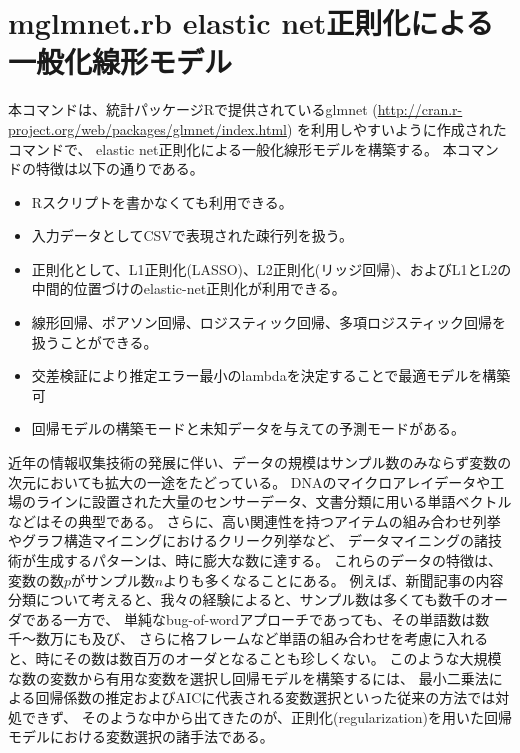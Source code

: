 

\section{mglmnet.rb elastic net正則化による一般化線形モデル\label{sect:mglmnet}}
本コマンドは、統計パッケージRで提供されているglmnet
(\url{http://cran.r-project.org/web/packages/glmnet/index.html})
を利用しやすいように作成されたコマンドで、
elastic net正則化による一般化線形モデルを構築する。
本コマンドの特徴は以下の通りである。

\begin{itemize}
 \item Rスクリプトを書かなくても利用できる。
 \item 入力データとしてCSVで表現された疎行列を扱う。
 \item 正則化として、L1正則化(LASSO)、L2正則化(リッジ回帰)、およびL1とL2の中間的位置づけのelastic-net正則化が利用できる。
 \item 線形回帰、ポアソン回帰、ロジスティック回帰、多項ロジスティック回帰を扱うことができる。
 \item 交差検証により推定エラー最小のlambdaを決定することで最適モデルを構築可
 \item 回帰モデルの構築モードと未知データを与えての予測モードがある。
\end{itemize}

近年の情報収集技術の発展に伴い、データの規模はサンプル数のみならず変数の次元においても拡大の一途をたどっている。
DNAのマイクロアレイデータや工場のラインに設置された大量のセンサーデータ、文書分類に用いる単語ベクトルなどはその典型である。
さらに、高い関連性を持つアイテムの組み合わせ列挙やグラフ構造マイニングにおけるクリーク列挙など、
データマイニングの諸技術が生成するパターンは、時に膨大な数に達する。
これらのデータの特徴は、変数の数$p$がサンプル数$n$よりも多くなることにある。
例えば、新聞記事の内容分類について考えると、我々の経験によると、サンプル数は多くても数千のオーダである一方で、
単純なbug-of-wordアプローチであっても、その単語数は数千〜数万にも及び、
さらに格フレームなど単語の組み合わせを考慮に入れると、時にその数は数百万のオーダとなることも珍しくない。
このような大規模な数の変数から有用な変数を選択し回帰モデルを構築するには、
最小二乗法による回帰係数の推定およびAICに代表される変数選択といった従来の方法では対処できず、
そのような中から出てきたのが、正則化(regularization)を用いた回帰モデルにおける変数選択の諸手法である。


